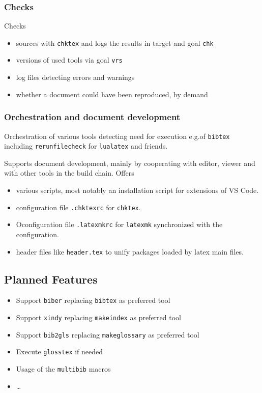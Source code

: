 \documentclass[a4paper,notumble,10pt,english]{leaflet}%
\begin{document}
\subsubsection{Checks}

Checks 
%
\begin{itemize}
  \item
  sources with \texttt{chktex} and logs the results in target and goal \texttt{chk} 
  \item
  versions of used tools via goal \texttt{vrs} 
  \item
  log files detecting errors and warnings 
  \item
  whether a document could have been reproduced, by demand 
\end{itemize}


\subsubsection{Orchestration and document development}

Orchestration of various tools detecting need for execution 
e.g.\@ of \texttt{bibtex} including \texttt{rerunfilecheck} for \texttt{lualatex} and friends.

Supports document development, mainly by cooperating with editor, viewer and with other tools in the build chain. 
Offers 
%
\begin{itemize}
  \item various scripts, 
  most notably an installation script for extensions of VS Code.
  \item configuration file \texttt{.chktexrc} for \texttt{chktex}.
  \item Oconfiguration file \texttt{.latexmkrc} 
  for \texttt{latexmk} synchronized with the configuration.
  \item header files like \texttt{header.tex} 
  to unify packages loaded by latex main files.
\end{itemize}

\subsection{Planned Features}

\begin{itemize}
  \item Support \texttt{biber} replacing \texttt{bibtex} as preferred tool
  \item Support \texttt{xindy} replacing \texttt{makeindex} as preferred tool
  \item Support \texttt{bib2gls} replacing \texttt{makeglossary} as preferred tool
  \item Execute \texttt{glosstex} if needed
  \item Usage of the \texttt{multibib} macros
  \item \dots
  \end{itemize}
\end{document}
